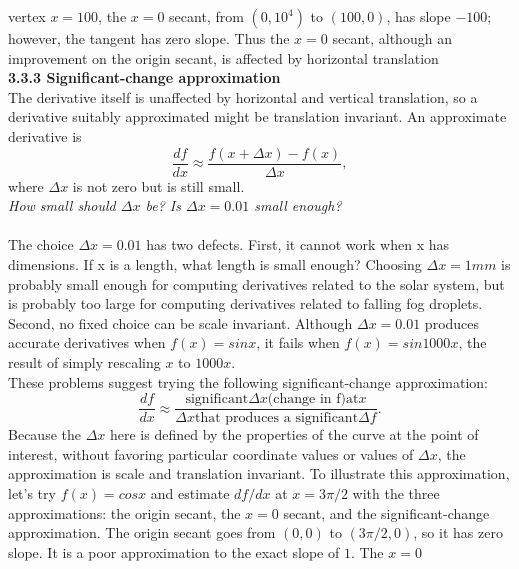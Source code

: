 \documentclass[a4paper, 12pt]{book}
\begin{document}
    vertex $x = 100$, the $x = 0$ secant, from $(0, 10^4)$ to $(100, 0)$, has slope $−100$;
    however, the tangent has zero slope. Thus the $x = 0$ secant, although an
    improvement on the origin secant, is affected by horizontal translation
    \\
    {\large\bf 3.3.3 Significant-change approximation}\\
    The derivative itself is unaffected by horizontal and vertical translation,
    so a derivative suitably approximated might be translation invariant. An
    approximate derivative is
    \begin{equation}\frac{df}{dx}\approx\frac{f(x+\Delta x)-f(x)}{\Delta x},\end{equation}
    where $\Delta x$ is not zero but is still small.
    \\
    {\it How small should $\Delta x$ be? Is $\Delta x = 0.01$ small enough?}\\
    \\
    The choice $\Delta x = 0.01$ has two defects. First, it cannot work when x has
    dimensions. If x is a length, what length is small enough? Choosing $\Delta x =
    1 mm$ is probably small enough for computing derivatives related to the
    solar system, but is probably too large for computing derivatives related
    to falling fog droplets. Second, no fixed choice can be scale invariant.
    Although $\Delta x = 0.01$ produces accurate derivatives when $f(x) = sin x$, it
    fails when $f(x) = sin 1000x$, the result of simply rescaling $x$ to $1000x$.
    \\
    {\large These problems suggest trying the following significant-change approximation:}\\
    \begin{equation}\frac{df}{dx}\approx\frac{\text{significant} \Delta x \text{(change in f)}\text{at} x}{\Delta x \text{that produces a significant} \Delta f}.\end{equation}
    Because the $\Delta x$ here is defined
    by the properties of the curve at the point
    of interest, without favoring particular coordinate values or values of $\Delta x$,
    the approximation is scale and translation invariant.
    To illustrate this approximation, let’s try $f(x) = cos x$ and estimate $df/dx$ at $x =
    3\pi/2$ with the three approximations: the origin secant, the $x = 0$ secant, and the significant-change approximation. The origin secant goes from $(0, 0)$ to $(3\pi/2, 0)$, so it has zero slope. It is a poor approximation to the exact slope of $1$. The $x = 0$
    
\end{document}
